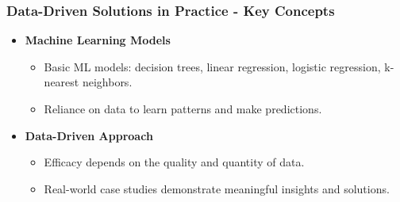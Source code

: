 \documentclass[aspectratio=169]{beamer}
\begin{document}
\begin{frame}[fragile]
    \frametitle{Data-Driven Solutions in Practice - Key Concepts}
    \begin{itemize}
        \item \textbf{Machine Learning Models} 
            \begin{itemize}
                \item Basic ML models: decision trees, linear regression, logistic regression, k-nearest neighbors.
                \item Reliance on data to learn patterns and make predictions.
            \end{itemize}
        \item \textbf{Data-Driven Approach}
            \begin{itemize}
                \item Efficacy depends on the quality and quantity of data.
                \item Real-world case studies demonstrate meaningful insights and solutions.
            \end{itemize}
    \end{itemize}
\end{frame}
\end{document}
